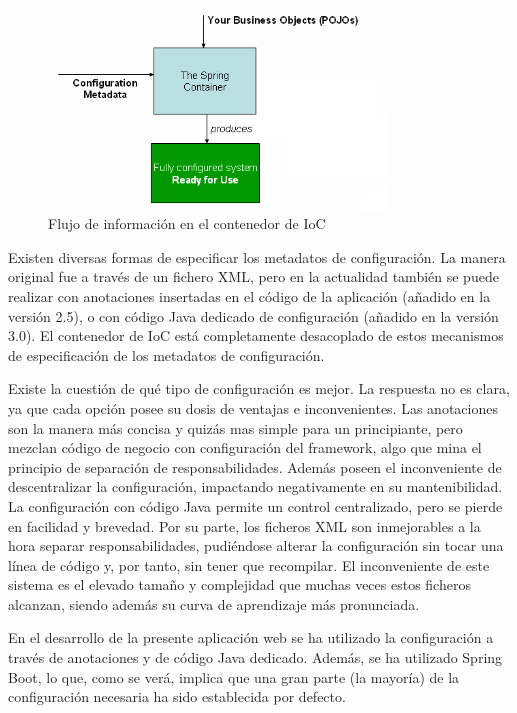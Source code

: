 \documentclass[a4paper]{article}
\begin{document}
    \begin{figure}[hbt!]
    	\centering
    	\includegraphics[width=0.8\textwidth,keepaspectratio]{container_magic}
    	\caption{Flujo de información en el contenedor de IoC}
    	\label{fig:container_magic}
    \end{figure}
    
    Existen diversas formas de especificar los metadatos de configuración. La manera original fue a través de un fichero XML, pero en la actualidad también se puede realizar con anotaciones insertadas en el código de la aplicación (añadido en la versión 2.5), o con código Java dedicado de configuración (añadido en la versión 3.0). El contenedor de IoC está completamente desacoplado de estos mecanismos de especificación de los metadatos de configuración.
    
    Existe la cuestión de qué tipo de configuración es mejor. La respuesta no es clara, ya que cada opción posee su dosis de ventajas e inconvenientes. Las anotaciones son la manera más concisa y quizás mas simple para un principiante, pero mezclan código de negocio con configuración del framework, algo que mina el principio de separación de responsabilidades. Además poseen el inconveniente de descentralizar la configuración, impactando negativamente en su mantenibilidad. La configuración con código Java permite un control centralizado, pero se pierde en facilidad y brevedad. Por su parte, los ficheros XML son inmejorables a la hora separar responsabilidades, pudiéndose alterar la configuración sin tocar una línea de código y, por tanto, sin tener que recompilar. El inconveniente de este sistema es el elevado tamaño y complejidad que muchas veces estos ficheros alcanzan, siendo además su curva de aprendizaje más pronunciada.
    
    En el desarrollo de la presente aplicación web se ha utilizado la configuración a través de anotaciones y de código Java dedicado. Además, se ha utilizado Spring Boot, lo que, como se verá, implica que una gran parte (la mayoría) de la configuración necesaria ha sido establecida por defecto.
    \\
    
\end{document}
